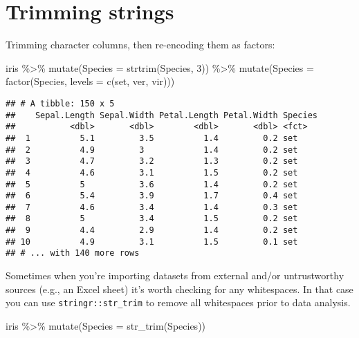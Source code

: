\documentclass[
]{book}
\newenvironment{Shaded}{\begin{snugshade}}{\end{snugshade}}
\newcommand{\AttributeTok}[1]{\textcolor[rgb]{0.77,0.63,0.00}{#1}}
\newcommand{\DecValTok}[1]{\textcolor[rgb]{0.00,0.00,0.81}{#1}}
\newcommand{\FunctionTok}[1]{\textcolor[rgb]{0.00,0.00,0.00}{#1}}
\newcommand{\NormalTok}[1]{#1}
\newcommand{\SpecialCharTok}[1]{\textcolor[rgb]{0.00,0.00,0.00}{#1}}
\newcommand{\StringTok}[1]{\textcolor[rgb]{0.31,0.60,0.02}{#1}}
\begin{document}
\hypertarget{trimming-strings}{%
\section{Trimming strings}\label{trimming-strings}}

Trimming character columns, then re-encoding them as factors:

\begin{Shaded}
\begin{Highlighting}[]
\NormalTok{iris }\SpecialCharTok{\%\textgreater{}\%} \FunctionTok{mutate}\NormalTok{(}\AttributeTok{Species =} \FunctionTok{strtrim}\NormalTok{(Species, }\DecValTok{3}\NormalTok{)) }\SpecialCharTok{\%\textgreater{}\%}
  \FunctionTok{mutate}\NormalTok{(}\AttributeTok{Species =} \FunctionTok{factor}\NormalTok{(Species, }\AttributeTok{levels =} \FunctionTok{c}\NormalTok{(}\StringTok{\textquotesingle{}set\textquotesingle{}}\NormalTok{, }\StringTok{\textquotesingle{}ver\textquotesingle{}}\NormalTok{, }\StringTok{\textquotesingle{}vir\textquotesingle{}}\NormalTok{)))}
\end{Highlighting}
\end{Shaded}

\begin{verbatim}
## # A tibble: 150 x 5
##    Sepal.Length Sepal.Width Petal.Length Petal.Width Species
##           <dbl>       <dbl>        <dbl>       <dbl> <fct>  
##  1          5.1         3.5          1.4         0.2 set    
##  2          4.9         3            1.4         0.2 set    
##  3          4.7         3.2          1.3         0.2 set    
##  4          4.6         3.1          1.5         0.2 set    
##  5          5           3.6          1.4         0.2 set    
##  6          5.4         3.9          1.7         0.4 set    
##  7          4.6         3.4          1.4         0.3 set    
##  8          5           3.4          1.5         0.2 set    
##  9          4.4         2.9          1.4         0.2 set    
## 10          4.9         3.1          1.5         0.1 set    
## # ... with 140 more rows
\end{verbatim}

Sometimes when you're importing datasets from external and/or untrustworthy sources (e.g., an Excel sheet) it's worth checking for any whitespaces. In that case you can use \texttt{stringr::str\_trim} to remove all whitespaces prior to data analysis.

\begin{Shaded}
\begin{Highlighting}[]
\NormalTok{iris }\SpecialCharTok{\%\textgreater{}\%} \FunctionTok{mutate}\NormalTok{(}\AttributeTok{Species =} \FunctionTok{str\_trim}\NormalTok{(Species))}
\end{Highlighting}
\end{Shaded}
\end{document}
